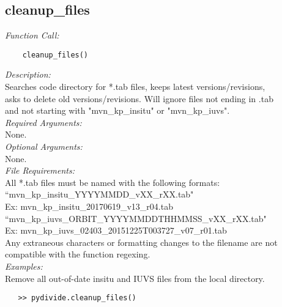 \documentclass{article}
\begin{document}
\subsection{cleanup\_files}
\label{subsec:cleanupfiles}
\vspace{-5mm}
\textit{Function Call:}\\
\vspace{-10mm}
\begin{verbatim}
    cleanup_files()
\end{verbatim}
\vspace{-5mm}
\noindent
\textit{Description:}\\
\indent Searches code directory for *.tab files, keeps latest versions/revisions,\\
\indent asks to delete old versions/revisions. Will ignore files not ending in .tab\\
\indent and not starting with "mvn\_kp\_insitu" or "mvn\_kp\_iuvs".\\
\textit{Required Arguments:}\\
\indent None.\\
\noindent \textit{Optional Arguments:}\\
\indent None.\\
\noindent \textit{File Requirements:}\\
\indent All *.tab files must be named with the following formats:\\
\indent \indent ``mvn\_kp\_insitu\_YYYYMMDD\_vXX\_rXX.tab"\\
\indent \indent \indent Ex: mvn\_kp\_insitu\_20170619\_v13\_r04.tab\\
\indent \indent ``mvn\_kp\_iuvs\_ORBIT\_YYYYMMDDTHHMMSS\_vXX\_rXX.tab"\\
\indent \indent \indent Ex: mvn\_kp\_iuvs\_02403\_20151225T003727\_v07\_r01.tab\\
\indent Any extraneous characters or formatting changes to the filename are not\\
\indent compatible with the function regexing.\\
\noindent \textit{Examples:}\\
\indent Remove all out-of-date insitu and IUVS files from the local directory.\\
\vspace{-10mm}
\begin{verbatim}
   >> pydivide.cleanup_files()
\end{verbatim}
\end{document}
